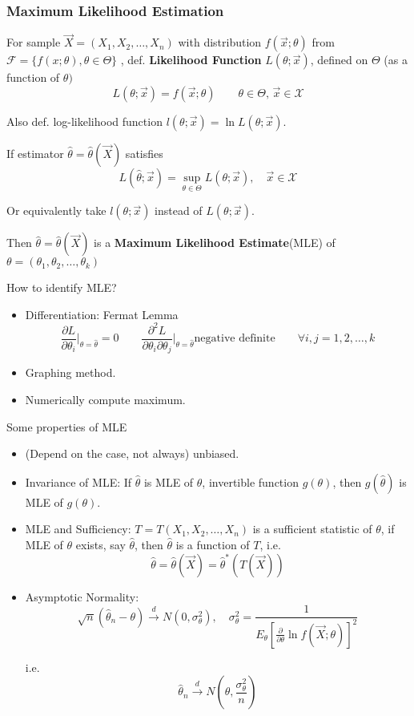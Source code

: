 \subsubsection{Maximum Likelihood Estimation}\label{SubSectionMLE}
    For sample $\vec{X}=(X_1,X_2,\ldots,X_n)$ with distribution $f(\vec{x};\theta)$ from $\mathscr{F}=\{f(x;\theta),\theta\in\Theta\}$ , def. \textbf{Likelihood Function} $L(\theta;\vec{x})$, defined on $\Theta$ (as a function of $\theta)$
    \[
        L(\theta;\vec{x})=f(\vec{x};\theta)\qquad \theta\in\Theta,\,\vec{x}\in\mathscr{X}    
    \]

    Also def. log-likelihood function $l(\theta;\vec{x})=\ln L(\theta;\vec{x})$.

    If estimator $\hat{\theta}=\hat{\theta}(\vec{X})$ satisfies
    \[
        L(\hat{\theta};\vec{x})=\sup_{\theta\in\Theta}L(\theta;\vec{x}),\quad \vec{x}\in\mathscr{X}
    \]

    Or equivalently take $l(\theta;\vec{x})$ instead of $L(\theta;\vec{x})$.

    Then $\hat{\theta}=\hat{\theta}(\vec{X})$ is a \textbf{Maximum Likelihood Estimate}(MLE) of $\theta=(\theta_1,\theta_2,\ldots,\theta_k)$

    How to identify MLE?
    \begin{itemize}
        \item Differentiation: Fermat Lemma
        \[
            \frac{\partial L}{\partial \theta_i}\bigg|_{\theta=\hat{\theta}}=0\qquad \frac{\partial^2 L}{\partial \theta_i \partial \theta_j}\bigg|_{\theta=\hat{\theta}}\text{negative definite}\qquad \forall i,j=1,2,\ldots,k
        \]
        \item Graphing method.
        \item Numerically compute maximum.
    \end{itemize}

    \begin{point}
        Some properties of MLE
    \end{point}
    
        
    \begin{itemize}
        \item (Depend on the case, not always) unbiased.
        \item Invariance of MLE: If $\hat{\theta}$ is MLE of $\theta$, invertible function $g(\theta)$, then $g(\hat{\theta})$ is MLE of $g(\theta)$.
        \item MLE and Sufficiency: $T=T(X_1,X_2,\ldots,X_n)$ is a sufficient statistic of $\theta$, if MLE of $\theta$ exists, say $\hat{\theta}$, then $\hat{\theta}$ is a function of $T$, i.e.
        \[  
            \hat{\theta}=\hat{\theta}(\vec{X})=\hat{\theta}^*(T(\vec{X}))    
        \]
        \item Asymptotic Normality: 
        \[
            \sqrt{n}(\hat{\theta}_n-\theta) \xrightarrow[]{d}N(0,\sigma^2_\theta),\quad \sigma^2_\theta=\frac{1}{E_\theta[\frac{\partial}{\partial\theta}\ln f(\vec{X};\theta)]^2}   
        \]

        i.e.
        \[
            \hat{\theta}_n\xrightarrow[]{d}N(\theta,\frac{\sigma^2_\theta}{n})    
        \]
        
    \end{itemize}

